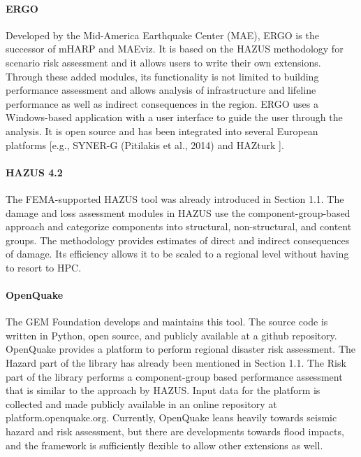 \paragraph{ERGO} Developed by the Mid-America Earthquake Center (MAE), ERGO is the successor of mHARP and MAEviz. It is based on the HAZUS methodology for scenario risk assessment and it allows users to write their own extensions. Through these added modules, its functionality is not limited to building performance assessment and allows analysis of infrastructure and lifeline performance as well as indirect consequences in the region. ERGO uses a Windows-based application with a user interface to guide the user through the analysis. It is open source and has been integrated into several European platforms [e.g., SYNER-G (Pitilakis et al., 2014) and HAZturk \citep{karaman2008earthquake}].

\paragraph{HAZUS 4.2} The FEMA-supported HAZUS tool was already introduced in Section 1.1. The damage and loss assessment modules in HAZUS use the component-group-based approach and categorize components into structural, non-structural, and content groups. The methodology provides estimates of direct and indirect consequences of damage. Its efficiency allows it to be scaled to a regional level without having to resort to HPC.

\paragraph{OpenQuake} The GEM Foundation develops and maintains this tool. The source code is written in Python, open source, and publicly available at a github repository. OpenQuake provides a platform to perform regional disaster risk assessment. The Hazard part of the library has already been mentioned in Section 1.1. The Risk part of the library performs a component-group based performance assessment that is similar to the approach by HAZUS. Input data for the platform is collected and made publicly available in an online repository at platform.openquake.org. Currently, OpenQuake leans heavily towards seismic hazard and risk assessment, but there are developments towards flood impacts, and the framework is sufficiently flexible to allow other extensions as well.

